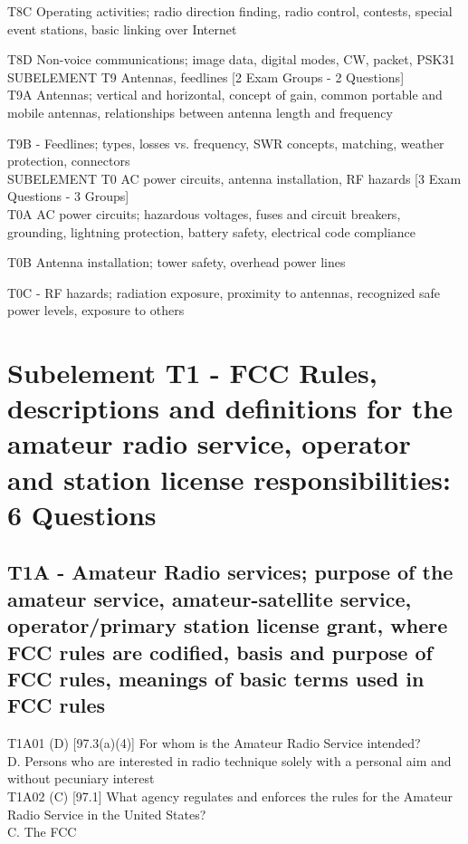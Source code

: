 \documentclass[12pt,letterpaper]{report}
\begin{document}
T8C   Operating activities; radio direction finding, radio control, contests, special event stations, basic linking over Internet

T8D   Non-voice communications; image data, digital modes, CW, packet, PSK31\\


SUBELEMENT T9   Antennas, feedlines [2 Exam Groups - 2 Questions]\\

T9A   Antennas; vertical and horizontal, concept of gain, common portable and mobile antennas, relationships between antenna length and frequency

T9B - Feedlines; types, losses vs. frequency, SWR concepts, matching, weather protection, connectors\\


SUBELEMENT T0   AC power circuits, antenna installation, RF hazards   [3 Exam Questions - 3 Groups]\\

T0A   AC power circuits; hazardous voltages, fuses and circuit breakers, grounding, lightning protection, battery safety, electrical code compliance

T0B   Antenna installation; tower safety, overhead power lines

T0C - RF hazards; radiation exposure, proximity to antennas, recognized safe power levels, exposure to others


\chapter{Subelement T1 - FCC Rules, descriptions and definitions for the amateur radio service, operator and station license responsibilities: 6 Questions}
\section{T1A - Amateur Radio services; purpose of the amateur service, amateur-satellite service, operator/primary station license grant, where FCC rules are codified, basis and purpose of FCC rules, meanings of basic terms used in FCC rules}

T1A01 (D) [97.3(a)(4)] For whom is the Amateur Radio Service intended?\\
D. Persons who are interested in radio technique solely with a personal aim and without pecuniary interest\\

T1A02 (C) [97.1] What agency regulates and enforces the rules for the Amateur Radio Service in the United States?\\
C. The FCC\\
\end{document}
